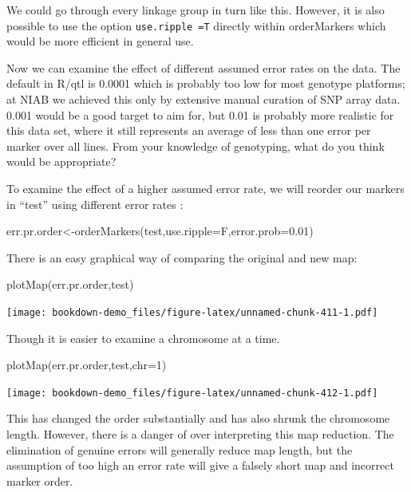 \documentclass[
]{book}
\newenvironment{Shaded}{\begin{snugshade}}{\end{snugshade}}
\newcommand{\AttributeTok}[1]{\textcolor[rgb]{0.77,0.63,0.00}{#1}}
\newcommand{\DecValTok}[1]{\textcolor[rgb]{0.00,0.00,0.81}{#1}}
\newcommand{\FloatTok}[1]{\textcolor[rgb]{0.00,0.00,0.81}{#1}}
\newcommand{\FunctionTok}[1]{\textcolor[rgb]{0.00,0.00,0.00}{#1}}
\newcommand{\NormalTok}[1]{#1}
\newcommand{\OtherTok}[1]{\textcolor[rgb]{0.56,0.35,0.01}{#1}}
\begin{document}
We could go through every linkage group in turn like this. However, it is also possible to use the option \texttt{use.ripple\ =T} directly within orderMarkers which would be more efficient in general use.

Now we can examine the effect of different assumed error rates on the data. The default in R/qtl is 0.0001 which is probably too low for most genotype platforms; at NIAB we achieved this only by extensive manual curation of SNP array data. 0.001 would be a good target to aim for, but 0.01 is probably more realistic for this data set, where it still represents an average of less than one error per marker over all lines. From your knowledge of genotyping, what do you think would be appropriate?

To examine the effect of a higher assumed error rate, we will reorder our markers in ``test'' using different error rates :

\begin{Shaded}
\begin{Highlighting}[]
\NormalTok{err.pr.order}\OtherTok{\textless{}{-}}\FunctionTok{orderMarkers}\NormalTok{(test,}\AttributeTok{use.ripple=}\NormalTok{F,}\AttributeTok{error.prob=}\FloatTok{0.01}\NormalTok{)}
\end{Highlighting}
\end{Shaded}

There is an easy graphical way of comparing the original and new map:

\begin{Shaded}
\begin{Highlighting}[]
\FunctionTok{plotMap}\NormalTok{(err.pr.order,test) }
\end{Highlighting}
\end{Shaded}

\texttt{[image: bookdown-demo\_files/figure-latex/unnamed-chunk-411-1.pdf]}

Though it is easier to examine a chromosome at a time.

\begin{Shaded}
\begin{Highlighting}[]
\FunctionTok{plotMap}\NormalTok{(err.pr.order,test,}\AttributeTok{chr=}\DecValTok{1}\NormalTok{) }
\end{Highlighting}
\end{Shaded}

\texttt{[image: bookdown-demo\_files/figure-latex/unnamed-chunk-412-1.pdf]}

This has changed the order substantially and has also shrunk the chromosome length. However, there is a danger of over interpreting this map reduction. The elimination of genuine errors will generally reduce map length, but the assumption of too high an error rate will give a falsely short map and incorrect marker order.
\end{document}
